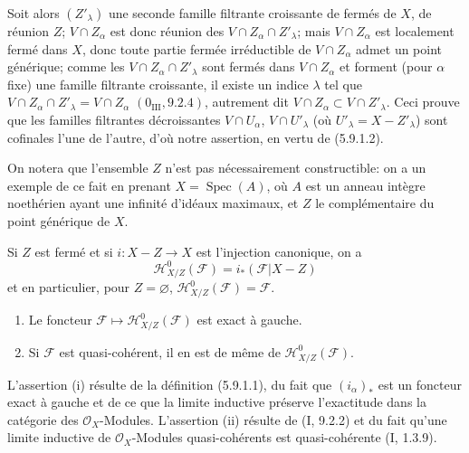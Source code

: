 \begin{env}[5.9.1]
Soit alors $(Z'_\lambda)$ une seconde famille filtrante croissante de fermés
de $X$, de réunion $Z$; $V\cap Z_\alpha$ est donc réunion des
$V\cap Z_\alpha\cap Z'_\lambda$; mais $V\cap Z_\alpha$ est localement fermé
dans $X$, donc toute partie fermée irréductible de $V\cap Z_\alpha$ admet un
point générique; comme les $V\cap Z_\alpha\cap Z'_\lambda$ sont fermés dans
$V\cap Z_\alpha$ et forment (pour $\alpha$ fixe) une famille filtrante
croissante, il existe un indice $\lambda$ tel que
$V\cap Z_\alpha\cap Z'_\lambda=V\cap Z_\alpha$
$(0_{\mathrm{III}},9.2.4)$, autrement dit
$V\cap Z_\alpha\subset V\cap Z'_\lambda$. Ceci prouve que les familles
filtrantes décroissantes $V\cap U_\alpha$, $V\cap U'_\lambda$ (où
$U'_\lambda=X-Z'_\lambda$) sont cofinales l'une de l'autre, d'où notre
assertion, en vertu de (5.9.1.2).
\end{env}


On notera que l'ensemble $Z$ n'est pas nécessairement constructible: on a un
exemple de ce fait en prenant $X=\operatorname{Spec}(A)$, où $A$ est un
anneau intègre noethérien ayant une infinité d'idéaux maximaux, et $Z$ le
complémentaire du point générique de $X$.

Si $Z$ est fermé et si $i:X-Z\to X$ est l'injection canonique, on a
\begin{equation}
\mathcal H^0_{X/Z}(\mathcal F)=i_*(\mathcal F|X-Z)
\tag{5.9.1.3}\label{IV.2.s5.9.1.3-fr}
\end{equation}
et en particulier, pour $Z=\varnothing$,
$\mathcal H^0_{X/Z}(\mathcal F)=\mathcal F$.

\begin{proposition}[5.9.2]
\label{IV.2.s5.9.2-fr}
\begin{enumerate}
\item[(i)] Le foncteur
$\mathcal F\mapsto\mathcal H^0_{X/Z}(\mathcal F)$ est exact à gauche.
\item[(ii)] Si $\mathcal F$ est quasi-cohérent, il en est de même de
$\mathcal H^0_{X/Z}(\mathcal F)$.
\end{enumerate}
\end{proposition}

L'assertion (i) résulte de la définition (5.9.1.1), du fait que
$(i_\alpha)_*$ est un foncteur exact à gauche et de ce que la limite
inductive préserve l'exactitude dans la catégorie des $\mathcal O_X$-Modules.
L'assertion (ii) résulte de (I, 9.2.2) et du fait qu'une limite inductive de
$\mathcal O_X$-Modules quasi-cohérents est quasi-cohérente (I, 1.3.9).

